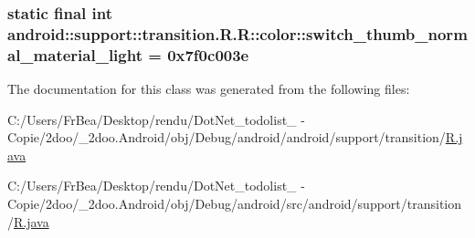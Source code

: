 \hypertarget{classandroid_1_1support_1_1transition_1_1_r_1_1color_db01c702ee6d5fc85f4d5fcfe2e2e173}{
\subsubsection[{switch\_\-thumb\_\-normal\_\-material\_\-light}]{\setlength{\rightskip}{0pt plus 5cm}static final int android::support::transition.R.R::color::switch\_\-thumb\_\-normal\_\-material\_\-light = 0x7f0c003e}}
\label{classandroid_1_1support_1_1transition_1_1_r_1_1color_db01c702ee6d5fc85f4d5fcfe2e2e173}




The documentation for this class was generated from the following files:\begin{CompactItemize}
\item 
C:/Users/FrBea/Desktop/rendu/DotNet\_\-todolist\_ - Copie/2doo/\_\-2doo.Android/obj/Debug/android/android/support/transition/\hyperlink{android_2support_2transition_2_r_8java}{R.java}\item 
C:/Users/FrBea/Desktop/rendu/DotNet\_\-todolist\_ - Copie/2doo/\_\-2doo.Android/obj/Debug/android/src/android/support/transition/\hyperlink{src_2android_2support_2transition_2_r_8java}{R.java}\end{CompactItemize}
